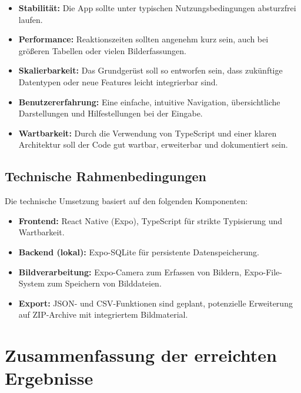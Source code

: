 \documentclass[a4paper,12pt]{article}
\begin{document}
\begin{itemize}[leftmargin=1.5cm]
    \item \textbf{Stabilität:} Die App sollte unter typischen Nutzungsbedingungen absturzfrei laufen.
    \item \textbf{Performance:} Reaktionszeiten sollten angenehm kurz sein, auch bei größeren Tabellen oder vielen Bilderfassungen.
    \item \textbf{Skalierbarkeit:} Das Grundgerüst soll so entworfen sein, dass zukünftige Datentypen oder neue Features leicht integrierbar sind.
    \item \textbf{Benutzererfahrung:} Eine einfache, intuitive Navigation, übersichtliche Darstellungen und Hilfestellungen bei der Eingabe.
    \item \textbf{Wartbarkeit:} Durch die Verwendung von TypeScript und einer klaren Architektur soll der Code gut wartbar, erweiterbar und dokumentiert sein.
\end{itemize}

\subsection{Technische Rahmenbedingungen}
Die technische Umsetzung basiert auf den folgenden Komponenten:
\begin{itemize}[leftmargin=1.5cm]
    \item \textbf{Frontend:} React Native (Expo), TypeScript für strikte Typisierung und Wartbarkeit.
    \item \textbf{Backend (lokal):} Expo-SQLite für persistente Datenspeicherung.
    \item \textbf{Bildverarbeitung:} Expo-Camera zum Erfassen von Bildern, Expo-File-System zum Speichern von Bilddateien.
    \item \textbf{Export:} JSON- und CSV-Funktionen sind geplant, potenzielle Erweiterung auf ZIP-Archive mit integriertem Bildmaterial.
\end{itemize}

\section{Zusammenfassung der erreichten Ergebnisse}
\end{document}
